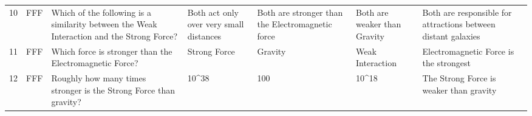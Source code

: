 \documentclass[10pt]{article}
\begin{document}
\begin{tiny}
\begin{longtable}{r P{0.3in} P{1.203in} P{0.8in} P{0.8in} P{0.8in} P{0.8in}}
    10    &     FFF &                                                                                                                                                                                        Which of the following is a similarity between the Weak Interaction and the Strong Force? &                                                                                               Both act only over very small distances &                                                      Both are stronger than the Electromagnetic force &                                                                                               Both are weaker than Gravity &                                                                     Both are responsible for attractions between distant galaxies \\
    11    &     FFF &                                                                                                                                                                                                                          Which force is stronger than the Electromagnetic Force? &                                                                                                                          Strong Force &                                                                                               Gravity &                                                                                                           Weak Interaction &                                                                                            Electromagnetic Force is the strongest \\
    12    &     FFF &                                                                                                                                                                                                                Roughly how many times stronger is the Strong Force than gravity? &                                                                                                                                 10\textasciicircum 38 &                                                                                                   100 &                                                                                                                      10\textasciicircum 18 &                                                                                           The Strong Force is weaker than gravity \\

\end{longtable}
\end{tiny}
\end{document}
